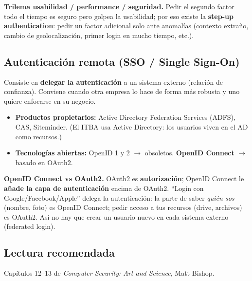 \documentclass[../main.tex]{subfiles}
\begin{document}
\begin{destacado}
\textbf{Trilema usabilidad / performance / seguridad.}  Pedir el segundo factor todo el tiempo es seguro pero golpea la usabilidad; por eso existe la \textbf{step-up authentication}: pedir un factor adicional solo ante anomalías (contexto extraño, cambio de geolocalización, primer login en mucho tiempo, etc.).
\end{destacado}

\subsection{Autenticación remota (SSO / Single Sign-On)}

Consiste en \textbf{delegar la autenticación} a un sistema externo (relación de confianza). Conviene cuando otra empresa lo hace de forma más robusta y uno quiere enfocarse en su negocio.

\begin{itemize}[itemsep=1pt]
  \item \textbf{Productos propietarios:} Active Directory Federation Services (ADFS), CAS, Siteminder. (El ITBA usa Active Directory: los usuarios viven en el AD como recursos.)
  \item \textbf{Tecnologías abiertas:} OpenID 1 y 2 $\to$ obsoletos. \textbf{OpenID Connect} $\to$ basado en OAuth2.
\end{itemize}

\begin{destacado}
\textbf{OpenID Connect vs OAuth2.} OAuth2 es \textbf{autorización}; OpenID Connect le \textbf{añade la capa de autenticación} encima de OAuth2. ``Login con Google/Facebook/Apple'' delega la autenticación: la parte de saber \emph{quién sos} (nombre, foto) es OpenID Connect; pedir acceso a tus recursos (drive, archivos) es OAuth2. Así no hay que crear un usuario nuevo en cada sistema externo (federated login).
\end{destacado}

\subsection{Lectura recomendada}
Capítulos 12--13 de \emph{Computer Security: Art and Science}, Matt Bishop.
\end{document}

